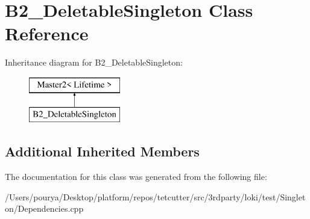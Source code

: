 \hypertarget{classB2__DeletableSingleton}{}\section{B2\+\_\+\+Deletable\+Singleton Class Reference}
\label{classB2__DeletableSingleton}
Inheritance diagram for B2\+\_\+\+Deletable\+Singleton\+:\begin{figure}[H]
\begin{center}
\leavevmode
\includegraphics[height=2.000000cm]{classB2__DeletableSingleton}
\end{center}
\end{figure}
\subsection*{Additional Inherited Members}


The documentation for this class was generated from the following file\+:\begin{DoxyCompactItemize}
\item 
/\+Users/pourya/\+Desktop/platform/repos/tetcutter/src/3rdparty/loki/test/\+Singleton/Dependencies.\+cpp\end{DoxyCompactItemize}
